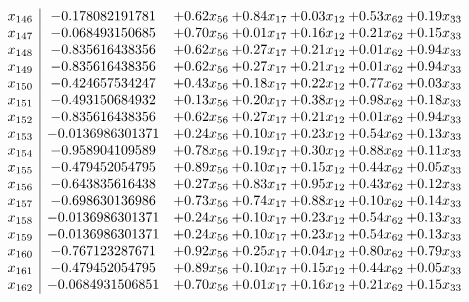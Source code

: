 \documentclass[8pt]{article}
\begin{document}
\[\begin{array}{c| c c@{\hskip 2pt} c@{\hskip 2pt} c@{\hskip 2pt} c@{\hskip 2pt} c@{\hskip 2pt} }
 x_{146}   &  -0.178082191781 & +  0.62 x_{56} & +  0.84 x_{17} & +  0.03 x_{12} & +  0.53 x_{62} & +  0.19 x_{33}\\
 x_{147}   &  -0.068493150685 & +  0.70 x_{56} & +  0.01 x_{17} & +  0.16 x_{12} & +  0.21 x_{62} & +  0.15 x_{33}\\
 x_{148}   &  -0.835616438356 & +  0.62 x_{56} & +  0.27 x_{17} & +  0.21 x_{12} & +  0.01 x_{62} & +  0.94 x_{33}\\
 x_{149}   &  -0.835616438356 & +  0.62 x_{56} & +  0.27 x_{17} & +  0.21 x_{12} & +  0.01 x_{62} & +  0.94 x_{33}\\
 x_{150}   &  -0.424657534247 & +  0.43 x_{56} & +  0.18 x_{17} & +  0.22 x_{12} & +  0.77 x_{62} & +  0.03 x_{33}\\
 x_{151}   &  -0.493150684932 & +  0.13 x_{56} & +  0.20 x_{17} & +  0.38 x_{12} & +  0.98 x_{62} & +  0.18 x_{33}\\
 x_{152}   &  -0.835616438356 & +  0.62 x_{56} & +  0.27 x_{17} & +  0.21 x_{12} & +  0.01 x_{62} & +  0.94 x_{33}\\
 x_{153}   &  -0.0136986301371 & +  0.24 x_{56} & +  0.10 x_{17} & +  0.23 x_{12} & +  0.54 x_{62} & +  0.13 x_{33}\\
 x_{154}   &  -0.958904109589 & +  0.78 x_{56} & +  0.19 x_{17} & +  0.30 x_{12} & +  0.88 x_{62} & +  0.11 x_{33}\\
 x_{155}   &  -0.479452054795 & +  0.89 x_{56} & +  0.10 x_{17} & +  0.15 x_{12} & +  0.44 x_{62} & +  0.05 x_{33}\\
 x_{156}   &  -0.643835616438 & +  0.27 x_{56} & +  0.83 x_{17} & +  0.95 x_{12} & +  0.43 x_{62} & +  0.12 x_{33}\\
 x_{157}   &  -0.698630136986 & +  0.73 x_{56} & +  0.74 x_{17} & +  0.88 x_{12} & +  0.10 x_{62} & +  0.14 x_{33}\\
 x_{158}   &  -0.0136986301371 & +  0.24 x_{56} & +  0.10 x_{17} & +  0.23 x_{12} & +  0.54 x_{62} & +  0.13 x_{33}\\
 x_{159}   &  -0.0136986301371 & +  0.24 x_{56} & +  0.10 x_{17} & +  0.23 x_{12} & +  0.54 x_{62} & +  0.13 x_{33}\\
 x_{160}   &  -0.767123287671 & +  0.92 x_{56} & +  0.25 x_{17} & +  0.04 x_{12} & +  0.80 x_{62} & +  0.79 x_{33}\\
 x_{161}   &  -0.479452054795 & +  0.89 x_{56} & +  0.10 x_{17} & +  0.15 x_{12} & +  0.44 x_{62} & +  0.05 x_{33}\\
 x_{162}   &  -0.0684931506851 & +  0.70 x_{56} & +  0.01 x_{17} & +  0.16 x_{12} & +  0.21 x_{62} & +  0.15 x_{33}\\

\end{array}\]
\end{document}
